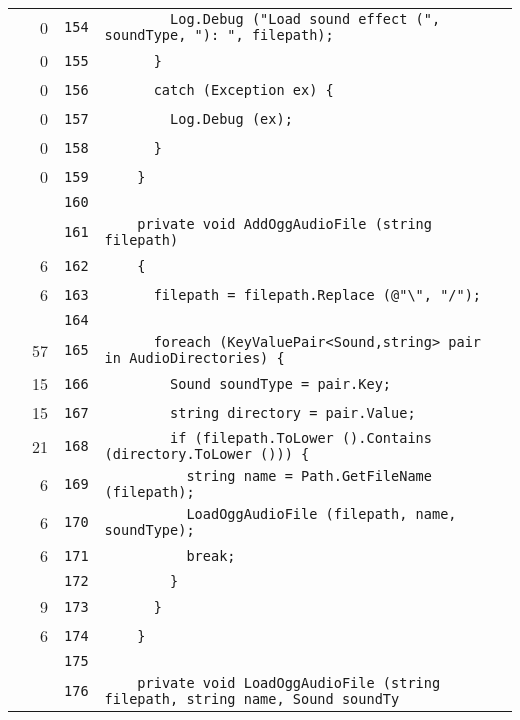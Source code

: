 \documentclass[a4paper,10pt]{article}
\begin{document}
\begin{longtable}[l]{lrrl}
\cellcolor{red} & 0 & \verb~154~ & \verb~        Log.Debug ("Load sound effect (", soundType, "): ", filepath);~\\
\cellcolor{red} & 0 & \verb~155~ & \verb~      }~\\
\cellcolor{red} & 0 & \verb~156~ & \verb~      catch (Exception ex) {~\\
\cellcolor{red} & 0 & \verb~157~ & \verb~        Log.Debug (ex);~\\
\cellcolor{red} & 0 & \verb~158~ & \verb~      }~\\
\cellcolor{red} & 0 & \verb~159~ & \verb~    }~\\
\cellcolor{gray} &  & \verb~160~ & \verb~~\\
\cellcolor{gray} &  & \verb~161~ & \verb~    private void AddOggAudioFile (string filepath)~\\
\cellcolor{green} & 6 & \verb~162~ & \verb~    {~\\
\cellcolor{green} & 6 & \verb~163~ & \verb~      filepath = filepath.Replace (@"\", "/");~\\
\cellcolor{gray} &  & \verb~164~ & \verb~~\\
\cellcolor{green} & 57 & \verb~165~ & \verb~      foreach (KeyValuePair<Sound,string> pair in AudioDirectories) {~\\
\cellcolor{green} & 15 & \verb~166~ & \verb~        Sound soundType = pair.Key;~\\
\cellcolor{green} & 15 & \verb~167~ & \verb~        string directory = pair.Value;~\\
\cellcolor{green} & 21 & \verb~168~ & \verb~        if (filepath.ToLower ().Contains (directory.ToLower ())) {~\\
\cellcolor{green} & 6 & \verb~169~ & \verb~          string name = Path.GetFileName (filepath);~\\
\cellcolor{green} & 6 & \verb~170~ & \verb~          LoadOggAudioFile (filepath, name, soundType);~\\
\cellcolor{green} & 6 & \verb~171~ & \verb~          break;~\\
\cellcolor{gray} &  & \verb~172~ & \verb~        }~\\
\cellcolor{green} & 9 & \verb~173~ & \verb~      }~\\
\cellcolor{green} & 6 & \verb~174~ & \verb~    }~\\
\cellcolor{gray} &  & \verb~175~ & \verb~~\\
\cellcolor{gray} &  & \verb~176~ & \verb~    private void LoadOggAudioFile (string filepath, string name, Sound soundTy~\\

\end{longtable}
\end{document}
